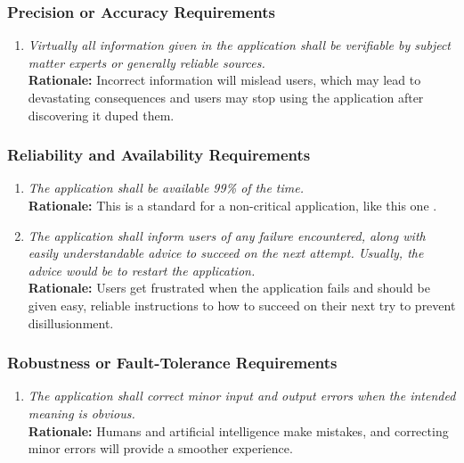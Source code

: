 \documentclass[]{article}
\begin{document}
\subsubsection{Precision or Accuracy Requirements}
\label{ssub:precision_or_accuracy_requirements}
\begin{enumerate}[{PR-PA}1. ]
	\item \textit{Virtually all information given in the application shall be verifiable by subject matter experts or generally reliable sources.} \\ \textbf{Rationale:} Incorrect information will mislead users, which may lead to devastating consequences and users may stop using the application after discovering it duped them.
\end{enumerate}

\subsubsection{Reliability and Availability Requirements}
\label{ssub:reliability_and_availability_requirements}
\begin{enumerate}[{PR-RA}1. ]
	\item \textit{The application shall be available 99\% of the time.} \\ \textbf{Rationale:} This is a standard for a non-critical application, like this one \cite{ConcreteCMS}.
        \item \textit{The application shall inform users of any failure encountered, along with easily understandable advice to succeed on the next attempt. Usually, the advice would be to restart the application.} \\ \textbf{Rationale:} Users get frustrated when the application fails and should be given easy, reliable instructions to how to succeed on their next try to prevent disillusionment.
\end{enumerate}

\subsubsection{Robustness or Fault-Tolerance Requirements}
\label{ssub:robustness_or_fault_tolerance_requirements}
\begin{enumerate}[{PR-RFT}1. ]
	\item \textit{The application shall correct minor input and output errors when the intended meaning is obvious.} \\ \textbf{Rationale:} Humans and artificial intelligence make mistakes, and correcting minor errors will provide a smoother experience.
\end{enumerate}
\end{document}
